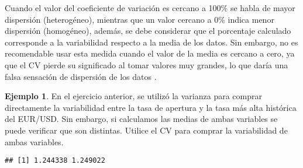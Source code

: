 \documentclass[
]{book}
\newenvironment{Shaded}{\begin{snugshade}}{\end{snugshade}}
\newcommand{\CommentTok}[1]{\textcolor[rgb]{0.56,0.35,0.01}{\textit{#1}}}
\newcommand{\DecValTok}[1]{\textcolor[rgb]{0.00,0.00,0.81}{#1}}
\newcommand{\FunctionTok}[1]{\textcolor[rgb]{0.00,0.00,0.00}{#1}}
\newcommand{\NormalTok}[1]{#1}
\newcommand{\OtherTok}[1]{\textcolor[rgb]{0.56,0.35,0.01}{#1}}
\newcommand{\SpecialCharTok}[1]{\textcolor[rgb]{0.00,0.00,0.00}{#1}}
\theoremstyle{definition}
\theoremstyle{definition}
\newtheorem{example}{Ejemplo}[chapter]
\theoremstyle{definition}
\theoremstyle{definition}
\theoremstyle{remark}
\begin{document}
Cuando el valor del coeficiente de variación es cercano a 100\% se habla de mayor dispersión (heterogéneo), mientras que un valor cercano a 0\% indica menor dispersión (homogéneo), además, se debe considerar que el porcentaje calculado corresponde a la variabilidad respecto a la media de los datos. Sin embargo, no es recomendable usar esta medida cuando el valor de la media es cercano a cero, ya que el CV pierde su significado al tomar valores muy grandes, lo que daría una falsa sensación de dispersión de los datos \citep[página 95]{anderson}.

\begin{example}

En el ejercicio anterior, se utilizó la varianza para comprar directamente la variabilidad entre la tasa de apertura y la tasa más alta histórica del EUR/USD. Sin embargo, si calculamos las medias de ambas variables se puede verificar que son distintas. Utilice el CV para comprar la variabilidad de ambas variables.

\begin{Shaded}
\end{Shaded}

\begin{verbatim}
## [1] 1.244338 1.249022
\end{verbatim}

\begin{Shaded}
\end{Shaded}


\end{example}
\end{document}
